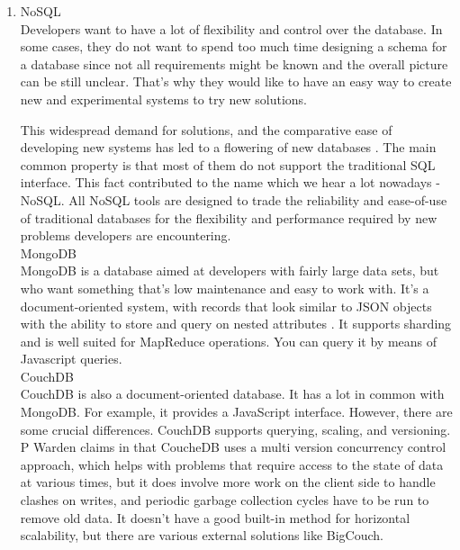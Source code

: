 \documentclass[runningheads]{llncs}
\begin{document}
\begin{enumerate}
\item NoSQL\\

Developers want to have a lot of flexibility and control over the database. In some cases, they do not want to spend too much time designing a schema for a database since not all requirements might be known and the overall picture can be still unclear. That's why they would like to have an easy way to create new and experimental systems to try new solutions.

This widespread demand for solutions, and the comparative ease of developing new systems has led to a flowering of new databases \cite{GLOSSARY}. The main common property is that most of them do not support the traditional SQL interface. This fact contributed to the name which we hear a lot nowadays - NoSQL. All NoSQL tools are designed to trade the reliability and ease-of-use of traditional databases for the flexibility and performance required by new problems developers are encountering.\\

MongoDB\\

MongoDB is a database aimed at developers with fairly large data sets, but who want something that's low maintenance and easy to work with. It's a document-oriented system, with records that look similar to JSON objects with the ability to store and query on nested attributes \cite{GLOSSARY}. It supports sharding and is well suited for MapReduce operations. You can query it by means of Javascript queries.\\ 

CouchDB\\

CouchDB is also a document-oriented database. It has a lot in common with MongoDB. For example, it provides
a JavaScript interface. However, there are some crucial differences. CouchDB supports querying, scaling, and versioning. P Warden claims in \cite{GLOSSARY} that CoucheDB uses a multi version concurrency control approach, which helps with problems that require access to the state of data at various times, but it does involve more work on the client side to handle clashes on writes, and periodic garbage collection cycles have to be run to remove old data. It doesn't have a good built-in method for horizontal scalability, but there are various external solutions like BigCouch.\\


\end{enumerate}
\end{document}
